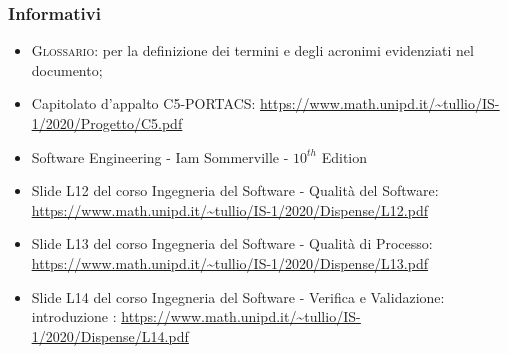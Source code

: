 \subsubsection{Informativi}
\begin{itemize}
	\item \textsc{Glossario}: per la definizione dei termini e degli acronimi evidenziati nel documento;
	\item Capitolato d'appalto C5-PORTACS: \newline
	\uline{\url{https://www.math.unipd.it/~tullio/IS-1/2020/Progetto/C5.pdf}}
	\item Software Engineering - Iam Sommerville - $10^{th}$ Edition
\item Slide L12 del corso Ingegneria del Software - Qualità del Software:\newline
\uline{\url{https://www.math.unipd.it/~tullio/IS-1/2020/Dispense/L12.pdf}}
\item Slide L13 del corso Ingegneria del Software - Qualità di Processo:\newline
\uline{\url{https://www.math.unipd.it/~tullio/IS-1/2020/Dispense/L13.pdf}}
\item Slide L14 del corso Ingegneria del Software - Verifica e Validazione: introduzione :\newline
\uline{\url{https://www.math.unipd.it/~tullio/IS-1/2020/Dispense/L14.pdf}}
\end{itemize}